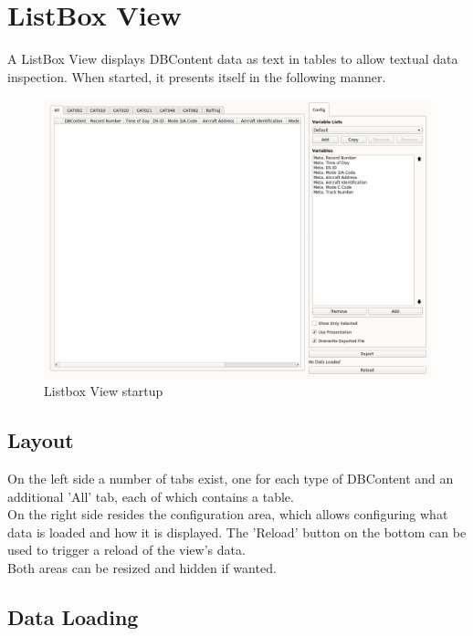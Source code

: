 \chapter{ListBox View}
\label{sec:listbox_view}

A ListBox View displays DBContent data as text in tables to allow textual data inspection. When started, it presents itself in the following manner.

\begin{figure}[H]
    \hspace*{-2cm}
    \includegraphics[width=18cm,frame]{figures/listbox_start.png}
  \caption{Listbox View startup}
  \label{fig:listbox_start}
\end{figure}

\section{Layout}

On the left side a number of tabs exist, one for each type of DBContent and an additional 'All' tab, each of which contains a table. \\

On the right side resides the configuration area, which allows configuring what data is loaded and how it is displayed.
The 'Reload' button on the bottom can be used to trigger a reload of the view's data.\\

Both areas can be resized and hidden if wanted.

\section{Data Loading}

